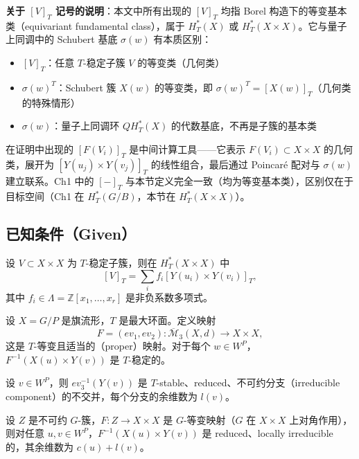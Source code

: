 \textbf{关于 $[V]_T$ 记号的说明}：本文中所有出现的 $[V]_T$ 均指 Borel 构造下的等变基本类（equivariant fundamental class），属于 $H_T^*(X)$ 或 $H_T^*(X \times X)$。它与量子上同调中的 Schubert 基底 $\sigma(w)$ 有本质区别：
\begin{itemize}
\item $[V]_T$：任意 $T$-稳定子簇 $V$ 的等变类（几何类）
\item $\sigma(w)^T$：Schubert 簇 $X(w)$ 的等变类，即 $\sigma(w)^T = [X(w)]_T$（几何类的特殊情形）
\item $\sigma(w)$：量子上同调环 $QH_T^*(X)$ 的代数基底，不再是子簇的基本类
\end{itemize}
在证明中出现的 $[F(V_i)]_T$ 是中间计算工具——它表示 $F(V_i) \subset X \times X$ 的几何类，展开为 $[Y(u_j) \times Y(v_j)]_T$ 的线性组合，最后通过 Poincaré 配对与 $\sigma(w)$ 建立联系。Ch1 中的 $[-]_T$ 与本节定义完全一致（均为等变基本类），区别仅在于目标空间（Ch1 在 $H_T^*(G/B)$，本节在 $H_T^*(X \times X)$）。

\subsection{已知条件（Given）}

\begin{Corollary}
\label{cor:GrahamOnXX}
设 $V \subset X \times X$ 为 $T$-稳定子簇，则在 $H_T^*(X \times X)$ 中
$$[V]_T = \sum_i f_i [Y(u_i) \times Y(v_i)]_T,$$
其中 $f_i \in \Lambda = \mathbb{Z}[x_1,\ldots,x_r]$ 是非负系数多项式。
\end{Corollary}

\begin{Lemma}
\label{prop:Lemma61F}
设 $X = G/P$ 是旗流形，$T$ 是最大环面。定义映射
$$F = (ev_1, ev_2) : \overline{\mathcal{M}}_{3}(X, d) \to X \times X,$$
这是 $T$-等变且适当的（proper）映射。对于每个 $w \in W^P$，$F^{-1}(X(u) \times Y(v))$ 是 $T$-稳定的。
\end{Lemma}

\begin{Lemma}
\label{prop:ev3inverse}
设 $v \in W^P$，则 $ev_3^{-1}(Y(v))$ 是 $T$-stable、reduced、不可约分支（irreducible component）的不交并，每个分支的余维数为 $l(v)$。
\end{Lemma}

\begin{Lemma}
\label{prop:KleimanTransversality}
设 $Z$ 是不可约 $G$-簇，$F: Z \to X \times X$ 是 $G$-等变映射（$G$ 在 $X \times X$ 上对角作用），则对任意 $u, v \in W^P$，$F^{-1}(X(u) \times Y(v))$ 是 reduced、locally irreducible 的，其余维数为 $c(u) + l(v)$。
\end{Lemma}

